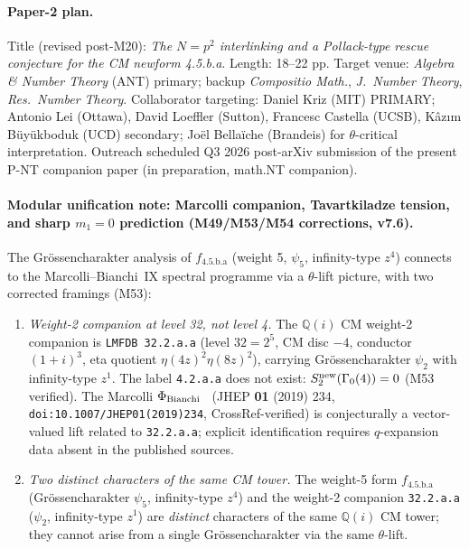 \documentclass[a4paper,11pt]{article}
\newcommand{\fLM}{f_{\text{4.5.b.a}}}
\newcommand{\Qi}{\mathbb{Q}(i)}
\theoremstyle{definition}
\theoremstyle{remark}
\begin{document}
\paragraph{Paper-2 plan.}
Title (revised post-M20): \emph{The $N=p^{2}$ interlinking and a
Pollack-type rescue conjecture for the CM newform 4.5.b.a}.
Length: 18--22 pp.  Target venue: \emph{Algebra \& Number Theory}
(ANT) primary; backup \emph{Compositio Math.}, \emph{J.\ Number
Theory}, \emph{Res.\ Number Theory}.  Collaborator targeting:
Daniel Kriz (MIT) PRIMARY; Antonio Lei (Ottawa), David Loeffler
(Sutton), Francesc Castella (UCSB), Kâzım Büyükboduk (UCD)
secondary; Joël Bellaïche (Brandeis) for $\theta$-critical
interpretation.  Outreach scheduled Q3 2026 post-arXiv submission
of the present P-NT companion paper (in preparation, math.NT companion).

\paragraph{Modular unification note: Marcolli companion, Tavartkiladze tension,
and sharp $m_1=0$ prediction (M49/M53/M54 corrections, v7.6).}
\label{para:unification}
The Gr\"ossencharakter analysis of $\fLM$ (weight 5, $\psi_5$,
infinity-type $z^4$) connects to the Marcolli--Bianchi~IX spectral
programme \cite{FFM2015,Fan2017} via a $\theta$-lift picture, with two
corrected framings (M53):
\begin{enumerate}
\item \emph{Weight-2 companion at level 32, not level 4.}
  The $\Qi$ CM weight-2 companion is
  \texttt{LMFDB~32.2.a.a} (level $32=2^5$, CM disc $-4$,
  conductor $(1+i)^3$, eta quotient $\eta(4z)^2\eta(8z)^2$),
  carrying Gr\"ossencharakter $\psi_2$ with infinity-type $z^1$.
  The label \texttt{4.2.a.a} does not exist: $S_2^{\rm new}(\Gamma_0(4))=0$
  (M53 verified).  The Marcolli $\Phi_{\rm Bianchi}$~\cite{FFM2015}
  (JHEP \textbf{01} (2019) 234, \texttt{doi:10.1007/JHEP01(2019)234},
  CrossRef-verified) is conjecturally a vector-valued lift related to
  \texttt{32.2.a.a}; explicit identification requires $q$-expansion data
  absent in the published sources.

\item \emph{Two distinct characters of the same CM tower.}
  The weight-5 form $\fLM$ (Gr\"ossencharakter $\psi_5$, infinity-type
  $z^4$) and the weight-2 companion \texttt{32.2.a.a}
  ($\psi_2$, infinity-type $z^1$) are \emph{distinct} characters of
  the same $\Qi$ CM tower; they cannot arise from a single
  Gr\"ossencharakter via the same $\theta$-lift.
\end{enumerate}
\end{document}
